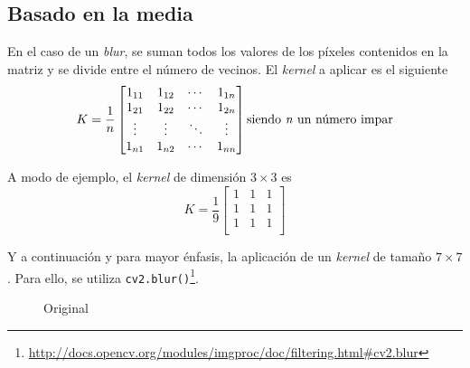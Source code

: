 \subsection{Basado en la media}
En el caso de un \emph{blur}, se suman todos los valores de los
píxeles contenidos en la matriz y se divide entre el número de
vecinos. El \emph{kernel} a aplicar es el siguiente
\begin{equation*}
  K = \frac{1}{n}
  \begin{bmatrix}
    1_{11} & 1_{12} & \cdots & 1_{1n} \\
    1_{21} & 1_{22} & \cdots & 1_{2n} \\
    \vdots & \vdots & \ddots & \vdots \\
    1_{n1} & 1_{n2} & \cdots & 1_{nn} \\
  \end{bmatrix}
  \text{siendo \emph{n} un número impar}
\end{equation*}

A modo de ejemplo, el \emph{kernel} de dimensión $3\times3$ es
\begin{equation*}
  K = \frac{1}{9}
  \begin{bmatrix}
    1 & 1 & 1 \\
    1 & 1 & 1 \\
    1 & 1 & 1 \\
  \end{bmatrix}
\end{equation*}

Y a continuación y para mayor énfasis, la aplicación de un
\emph{kernel} de tamaño $7 \times 7$. Para ello, se utiliza
\texttt{cv2.blur()}\footnote{\url{http://docs.opencv.org/modules/imgproc/doc/filtering.html\#cv2.blur}}.\\


\begin{figure}[H]
  \caption{Original}
  \centering \setlength\fboxsep{0pt} \setlength\fboxrule{0.5pt}
\end{figure}

